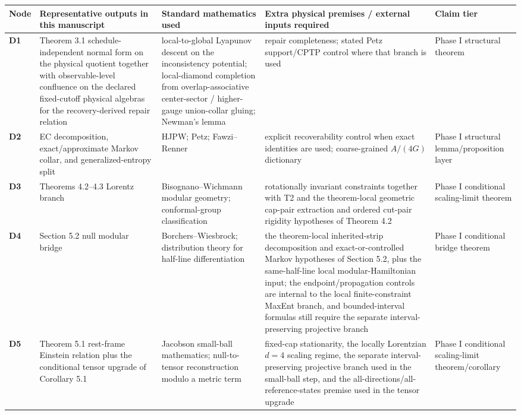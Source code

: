 \begingroup
\scriptsize
{\def\LTcaptype{none}
\setlength{\tabcolsep}{2pt}
\begin{longtable}[]{@{}>{\RaggedRight\arraybackslash}p{}>{\RaggedRight\arraybackslash}p{}>{\RaggedRight\arraybackslash}p{}>{\RaggedRight\arraybackslash}p{}>{\RaggedRight\arraybackslash}p{}@{}}
\toprule\noalign{}
Node & Representative outputs in this manuscript & Standard mathematics used & Extra physical premises / external inputs required & Claim tier \\
\midrule\noalign{}
\endhead
\bottomrule\noalign{}
\endlastfoot
\textbf{D1} & Theorem 3.1 schedule-independent normal form on the physical quotient together with observable-level confluence on the declared fixed-cutoff physical algebras for the recovery-derived repair relation & local-to-global Lyapunov descent on the inconsistency potential; local-diamond completion from overlap-associative center-sector / higher-gauge union-collar gluing; Newman's lemma & repair completeness; stated Petz support/CPTP control where that branch is used & Phase I structural theorem \\
\textbf{D2} & EC decomposition, exact/approximate Markov collar, and generalized-entropy split & HJPW; Petz; Fawzi--Renner & explicit recoverability control when exact identities are used; coarse-grained \(A/(4G)\) dictionary & Phase I structural lemma/proposition layer \\
\textbf{D3} & Theorems 4.2--4.3 Lorentz branch & Bisognano--Wichmann modular geometry; conformal-group classification & rotationally invariant constraints together with T2 and the theorem-local geometric cap-pair extraction and ordered cut-pair rigidity hypotheses of Theorem 4.2 & Phase I conditional scaling-limit theorem \\
\textbf{D4} & Section 5.2 null modular bridge & Borchers--Wiesbrock; distribution theory for half-line differentiation & the theorem-local inherited-strip decomposition and exact-or-controlled Markov hypotheses of Section 5.2, plus the same-half-line local modular-Hamiltonian input; the endpoint/propagation controls are internal to the local finite-constraint MaxEnt branch, and bounded-interval formulas still require the separate interval-preserving projective branch & Phase I conditional bridge theorem \\
\textbf{D5} & Theorem 5.1 rest-frame Einstein relation plus the conditional tensor upgrade of Corollary 5.1 & Jacobson small-ball mathematics; null-to-tensor reconstruction modulo a metric term & fixed-cap stationarity, the locally Lorentzian \(d=4\) scaling regime, the separate interval-preserving projective branch used in the small-ball step, and the all-directions/all-reference-states premise used in the tensor upgrade & Phase I conditional scaling-limit theorem/corollary \\

\end{longtable}}
